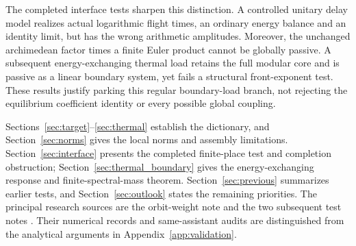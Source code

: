 The completed interface tests sharpen this distinction. A controlled
unitary delay model realizes actual logarithmic flight times, an ordinary
energy balance and an identity limit, but has the wrong arithmetic
amplitudes. Moreover, the unchanged archimedean factor times a finite
Euler product cannot be globally passive. A subsequent energy-exchanging
thermal load retains the full modular core and is passive as a linear
boundary system, yet fails a structural front-exponent test. These
results justify parking this regular boundary-load branch, not rejecting
the equilibrium coefficient identity or every possible global coupling.

Sections~\ref{sec:target}--\ref{sec:thermal} establish the dictionary,
and Section~\ref{sec:norms} gives the local norms and assembly limitations.
Section~\ref{sec:interface} presents the completed finite-place test and
completion obstruction; Section~\ref{sec:thermal_boundary} gives the
energy-exchanging response and finite-spectral-mass theorem.
Section~\ref{sec:previous} summarizes earlier tests, and
Section~\ref{sec:outlook} states the remaining priorities. The principal
research sources are the orbit-weight note \cite{OrbitNote} and the two
subsequent test notes \cite{InterfaceNote,BoundaryNote}. Their numerical
records and same-assistant audits are distinguished from the analytical
arguments in Appendix~\ref{app:validation}.
